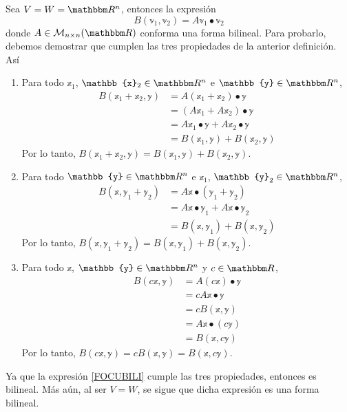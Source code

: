 \begin{example}\label{example:bil_1}
    Sea $V = W = \RR[n]$, entonces la expresión
    \begin{equation}
        B(\mathbb{v}_1, \mathbb{v}_2) = A\mathbb{v}_1 \bullet \mathbb{v}_2 \label{FOCUBILI}
    \end{equation}
    donde $A \in \mathcal{M}_{n \times n}(\RR)$ conforma una forma bilineal. Para probarlo, debemos demostrar que cumplen las tres propiedades de la anterior definición. Así
    \begin{enumerate}[label=\roman*)]
        \item Para todo $\mathbb{x}_1$, $\mathbb{x}_2 \in \RR[n]$ e $\mathbb{y} \in \RR[n]$,
        \begin{align*}
            B(\mathbb{x}_1 + \mathbb{x}_2, \mathbb{y}) & = A(\mathbb{x}_1 + \mathbb{x}_2) \bullet \mathbb{y} \\
            & = (A\mathbb{x}_1 + A\mathbb{x}_2) \bullet \mathbb{y} \\
            & = A\mathbb{x}_1 \bullet \mathbb{y} + A\mathbb{x}_2 \bullet \mathbb{y} \\
            & = B(\mathbb{x}_1, \mathbb{y}) + B(\mathbb{x}_2, \mathbb{y})
        \end{align*}
        Por lo tanto, $B(\mathbb{x}_1 + \mathbb{x}_2, \mathbb{y}) = B(\mathbb{x}_1, \mathbb{y}) + B(\mathbb{x}_2, \mathbb{y})$.
        \item Para todo $\mathbb{y} \in \RR[n]$ e $\mathbb{x}_1$, $\mathbb{y}_2 \in \RR[n]$,
        \begin{align*}
            B(\mathbb{x}, \mathbb{y}_1 + \mathbb{y}_2) & = A\mathbb{x} \bullet (\mathbb{y}_1 + \mathbb{y}_2) \\
            & = A\mathbb{x} \bullet \mathbb{y}_1 + A\mathbb{x} \bullet \mathbb{y}_2 \\
            & = B(\mathbb{x}, \mathbb{y}_1) + B(\mathbb{x}, \mathbb{y}_2)
        \end{align*}
        Por lo tanto, $B(\mathbb{x}, \mathbb{y}_1 + \mathbb{y}_2) = B(\mathbb{x}, \mathbb{y}_1) + B(\mathbb{x}, \mathbb{y}_2)$.
        \item Para todo $\mathbb{x}$, $\mathbb{y} \in \RR[n]$ y $c \in \RR$,
        \begin{align*}
            B(c\mathbb{x}, \mathbb{y}) & = A(c\mathbb{x}) \bullet \mathbb{y} \\
            & = cA\mathbb{x} \bullet \mathbb{y} \\
            & = cB(\mathbb{x}, \mathbb{y}) \\
            & = A\mathbb{x} \bullet (c\mathbb{y}) \\
            & = B(\mathbb{x}, c\mathbb{y})
        \end{align*}
        Por lo tanto, $B(c\mathbb{x}, \mathbb{y}) = cB(\mathbb{x}, \mathbb{y}) = B(\mathbb{x}, c\mathbb{y})$.
    \end{enumerate}
    Ya que la expresión \eqref{FOCUBILI} cumple las tres propiedades, entonces es bilineal. Más aún, al ser $V = W$, se sigue que dicha expresión es una forma bilineal.
\end{example}

